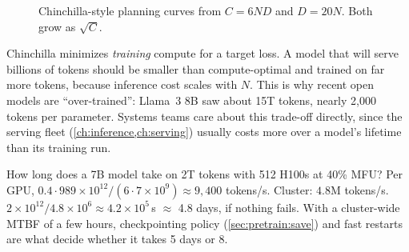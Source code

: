 \begin{figure}[t]
\centering
{}
\caption{Chinchilla-style planning curves from $C=6ND$ and $D=20N$. Both grow as $\sqrt C$.}
\label{fig:pretrain:chinchilla}
\end{figure}

\begin{keyidea}
Chinchilla minimizes \emph{training} compute for a target loss. A model that will serve
billions of tokens should be smaller than compute-optimal and trained on far more tokens,
because inference cost scales with $N$. This is why recent open models are ``over-trained'':
Llama~3 8B saw about 15T tokens, nearly 2{,}000 tokens per parameter. Systems teams care about
this trade-off directly, since the serving fleet (\cref{ch:inference,ch:serving}) usually costs
more over a model's lifetime than its training run.
\end{keyidea}

\begin{napkinmath}
How long does a 7B model take on 2T tokens with 512 H100s at 40\% MFU? Per GPU,
$0.4\cdot989\times10^{12}/(6\cdot7\times10^9)\approx9{,}400$ tokens/s. Cluster: $4.8$M tokens/s.
$2\times10^{12}/4.8\times10^6\approx4.2\times10^5$\,s $\approx$ 4.8 days, if nothing fails. With a
cluster-wide MTBF of a few hours, checkpointing policy (\cref{sec:pretrain:save}) and
fast restarts are what decide whether it takes 5 days or 8.
\end{napkinmath}

